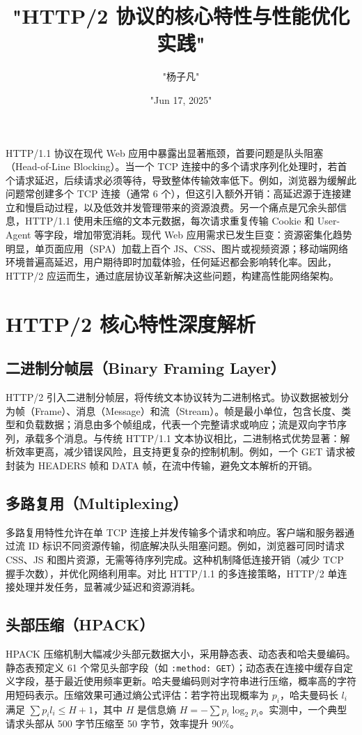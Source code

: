 \title{"HTTP/2 协议的核心特性与性能优化实践"}
\author{"杨子凡"}
\date{"Jun 17, 2025"}
\maketitle
HTTP/1.1 协议在现代 Web 应用中暴露出显著瓶颈，首要问题是队头阻塞（Head-of-Line Blocking）。当一个 TCP 连接中的多个请求序列化处理时，若首个请求延迟，后续请求必须等待，导致整体传输效率低下。例如，浏览器为缓解此问题常创建多个 TCP 连接（通常 6 个），但这引入额外开销：高延迟源于连接建立和慢启动过程，以及低效并发管理带来的资源浪费。另一个痛点是冗余头部信息，HTTP/1.1 使用未压缩的文本元数据，每次请求重复传输 Cookie 和 User-Agent 等字段，增加带宽消耗。现代 Web 应用需求已发生巨变：资源密集化趋势明显，单页面应用（SPA）加载上百个 JS、CSS、图片或视频资源；移动端网络环境普遍高延迟，用户期待即时加载体验，任何延迟都会影响转化率。因此，HTTP/2 应运而生，通过底层协议革新解决这些问题，构建高性能网络架构。\par
\chapter{HTTP/2 核心特性深度解析}
\section{二进制分帧层（Binary Framing Layer）}
HTTP/2 引入二进制分帧层，将传统文本协议转为二进制格式。协议数据被划分为帧（Frame）、消息（Message）和流（Stream）。帧是最小单位，包含长度、类型和负载数据；消息由多个帧组成，代表一个完整请求或响应；流是双向字节序列，承载多个消息。与传统 HTTP/1.1 文本协议相比，二进制格式优势显著：解析效率更高，减少错误风险，且支持更复杂的控制机制。例如，一个 GET 请求被封装为 HEADERS 帧和 DATA 帧，在流中传输，避免文本解析的开销。\par
\section{多路复用（Multiplexing）}
多路复用特性允许在单 TCP 连接上并发传输多个请求和响应。客户端和服务器通过流 ID 标识不同资源传输，彻底解决队头阻塞问题。例如，浏览器可同时请求 CSS、JS 和图片资源，无需等待序列完成。这种机制降低连接开销（减少 TCP 握手次数），并优化网络利用率。对比 HTTP/1.1 的多连接策略，HTTP/2 单连接处理并发任务，显著减少延迟和资源消耗。\par
\section{头部压缩（HPACK）}
HPACK 压缩机制大幅减少头部元数据大小，采用静态表、动态表和哈夫曼编码。静态表预定义 61 个常见头部字段（如 \texttt{:method: GET}）；动态表在连接中缓存自定义字段，基于最近使用频率更新。哈夫曼编码则对字符串进行压缩，概率高的字符用短码表示。压缩效果可通过熵公式评估：若字符出现概率为 $p_i$，哈夫曼码长 $l_i$ 满足 $\sum p_i l_i \leq H + 1$，其中 $H$ 是信息熵 $H = -\sum p_i \log_2 p_i$。实测中，一个典型请求头部从 500 字节压缩至 50 字节，效率提升 90\%{}。\par
